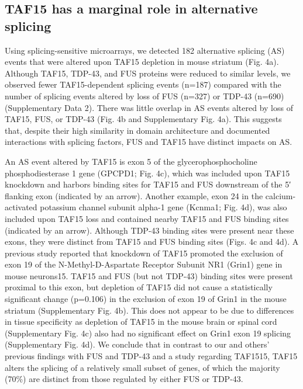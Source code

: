 \subsection{TAF15 has a marginal role in alternative splicing}
Using splicing-sensitive microarrays, we detected 182 alternative splicing (AS) events that were altered upon TAF15 depletion in mouse striatum (Fig. 4a). Although TAF15, TDP-43, and FUS proteins were reduced to similar levels, we observed fewer TAF15-dependent splicing events (n=187) compared with the number of splicing events altered by loss of FUS (n=327) or TDP-43 (n=690) (Supplementary Data 2). There was little overlap in AS events altered by loss of TAF15, FUS, or TDP-43 (Fig. 4b and Supplementary Fig. 4a). This suggests that, despite their high similarity in domain architecture and documented interactions with splicing factors\cite{Jobert2009a,Yamazaki2012}, FUS and TAF15 have distinct impacts on AS.


An AS event altered by TAF15 is exon 5 of the glycerophosphocholine phosphodiesterase 1 gene (GPCPD1; Fig. 4c), which was included upon TAF15 knockdown and harbors binding sites for TAF15 and FUS downstream of the 5′ flanking exon (indicated by an arrow). Another example, exon 24 in the calcium-activated potassium channel subunit alpha-1 gene (Kcnma1; Fig. 4d), was also included upon TAF15 loss and contained nearby TAF15 and FUS binding sites (indicated by an arrow). Although TDP-43 binding sites were present near these exons, they were distinct from TAF15 and FUS binding sites (Figs. 4c and 4d). A previous study reported that knockdown of TAF15 promoted the exclusion of exon 19 of the N-Methyl-D-Aspartate Receptor Subunit NR1 (Grin1) gene in mouse neurons15. TAF15 and FUS (but not TDP-43) binding sites were present proximal to this exon, but depletion of TAF15 did not cause a statistically significant change (p=0.106) in the exclusion of exon 19 of Grin1 in the mouse striatum (Supplementary Fig. 4b). This does not appear to be due to differences in tissue specificity as depletion of TAF15 in the mouse brain or spinal cord (Supplementary Fig. 4c) also had no significant effect on Grin1 exon 19 splicing (Supplementary Fig. 4d). We conclude that in contrast to our and others’ previous findings with FUS and TDP-43\cite{Rogelj2012,Lagier-Tourenne2012,Polymenidou2011,Tollervey2011} and a study regarding TAF1515, TAF15 alters the splicing of a relatively small subset of genes, of which the majority (70\%) are distinct from those regulated by either FUS or TDP-43.

